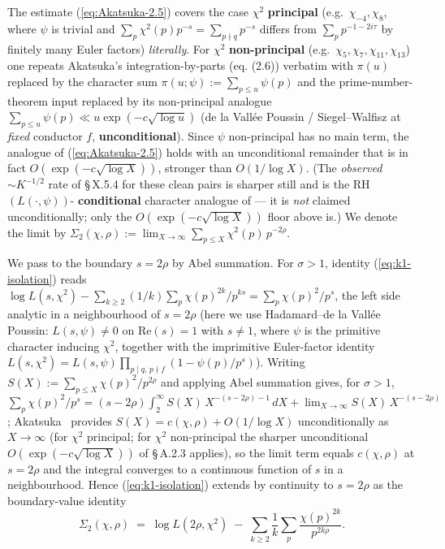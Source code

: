The estimate (\ref{eq:Akatsuka-2.5}) covers the case
\(\chi^2\) \textbf{principal} (e.g.~\(\chi_{-4}, \chi_8\), where \(\psi\) is
trivial and \(\sum_p\chi^2(p)p^{-s} = \sum_{p\nmid q} p^{-s}\) differs
from \(\sum_p p^{-1-2i\tau}\) by finitely many Euler factors)
\emph{literally}. For \(\chi^2\) \textbf{non-principal} (e.g.~\(\chi_5,
\chi_7, \chi_{11}, \chi_{13}\)) one repeats Akatsuka's
integration-by-parts (eq. (2.6)) verbatim with \(\pi(u)\) replaced by
the character sum \(\pi(u;\psi) := \sum_{p \le u}\psi(p)\) and the
prime-number-theorem input replaced by its non-principal analogue
\(\sum_{p\le u}\psi(p) \ll u\exp(-c\sqrt{\log u})\) (de la Vallée
Poussin / Siegel--Walfisz at \emph{fixed} conductor \(f\), \textbf{unconditional}).
Since \(\psi\) non-principal has no main term, the analogue of
(\ref{eq:Akatsuka-2.5}) holds with an unconditional remainder that
is in fact \(O(\exp(-c\sqrt{\log X}))\), stronger than
\(O(1/\log X)\). (The \emph{observed} \(\sim K^{-1/2}\) rate of \S\,X.5.4 for
these clean pairs is sharper still and is the RH\((L(\cdot,\psi))\)-
\textbf{conditional} character analogue of \cite{Soundararajan2009} --- it is
\emph{not} claimed unconditionally; only the \(O(\exp(-c\sqrt{\log X}))\)
floor above is.) We denote the limit by
\(\Sigma_2(\chi,\rho) := \lim_{X \to \infty} \sum_{p \le X} \chi^2(p)\,p^{-2\rho}\).

We pass to the boundary \(s = 2\rho\) by Abel summation. For
\(\sigma > 1\), identity (\ref{eq:k1-isolation}) reads
\(\log L(s,\chi^2) - \sum_{k\ge 2}(1/k)\sum_p \chi(p)^{2k}/p^{ks}
= \sum_p \chi(p)^2/p^s\),
the left side analytic in a neighbourhood of \(s = 2\rho\) (here we
use Hadamard--de la Vallée Poussin: \(L(s, \psi) \ne 0\) on
\(\mathrm{Re}(s) = 1\) with \(s \ne 1\), where \(\psi\) is the primitive
character inducing \(\chi^2\), together with the imprimitive Euler-factor
identity \(L(s,\chi^2) = L(s,\psi)\prod_{p\mid q,\,p\nmid f}(1 - \psi(p)/p^s)\)).
Writing \(S(X) := \sum_{p \le X} \chi(p)^2/p^{2\rho}\) and applying
Abel summation gives, for \(\sigma > 1\),
\(\sum_p \chi(p)^2/p^s = (s - 2\rho)\int_2^\infty S(X)\,X^{-(s - 2\rho) - 1}\,dX
+ \lim_{X\to\infty} S(X)\,X^{-(s-2\rho)}\);
Akatsuka~\cite[Lemma~2.1 \& eq.~(2.5)]{Akatsuka2017EulerProduct} provides \(S(X) = c(\chi,\rho) + O(1/\log X)\)
unconditionally as \(X \to \infty\) (for \(\chi^2\) principal; for
\(\chi^2\) non-principal the sharper unconditional
\(O(\exp(-c\sqrt{\log X}))\) of \S\,A.2.3 applies), so the limit term equals
\(c(\chi,\rho)\) at \(s = 2\rho\) and the integral converges to a
continuous function of \(s\) in a neighbourhood. Hence
(\ref{eq:k1-isolation}) extends by continuity to \(s = 2\rho\) as the
boundary-value identity
\begin{equation}
\label{eq:Sigma2-id}
\Sigma_2(\chi,\rho)
\;=\;
\log L(2\rho, \chi^2)
\;-\; \sum_{k \ge 2} \frac{1}{k} \sum_{p}
\frac{\chi(p)^{2k}}{p^{2k\rho}}.
\end{equation}

